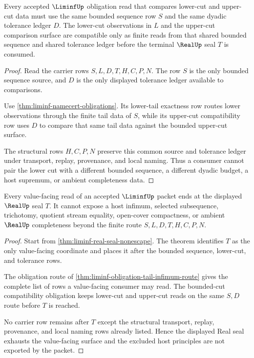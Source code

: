 \begin{theorem}
\label{thm:liminf-obligation-bounded-cut-compatibility}
Every accepted $\LiminfUp$ obligation read that compares lower-cut and upper-cut data must use the same bounded sequence row $S$ and the same dyadic tolerance ledger $D$. The lower-cut observations in $L$ and the upper-cut comparison surface are compatible only as finite reads from that shared bounded sequence and shared tolerance ledger before the terminal $\RealUp$ seal $T$ is consumed.
\end{theorem}
\begin{proof}
Read the carrier rows $S,L,D,T,H,C,P,N$. The row $S$ is the only bounded sequence source, and $D$ is the only displayed tolerance ledger available to comparisons.

Use \autoref{thm:liminf-namecert-obligations}. Its lower-tail exactness row routes lower observations through the finite tail data of $S$, while its upper-cut compatibility row uses $D$ to compare that same tail data against the bounded upper-cut surface.

The structural rows $H,C,P,N$ preserve this common source and tolerance ledger under transport, replay, provenance, and local naming. Thus a consumer cannot pair the lower cut with a different bounded sequence, a different dyadic budget, a host supremum, or ambient completeness data.
\end{proof}

\begin{theorem}
\label{thm:liminf-obligation-real-seal-exhaustion}
Every value-facing read of an accepted $\LiminfUp$ packet ends at the displayed $\RealUp$ seal $T$. It cannot expose a host infimum, selected subsequence, trichotomy, quotient stream equality, open-cover compactness, or ambient $\RealUp$ completeness beyond the finite route $S,L,D,T,H,C,P,N$.
\end{theorem}
\begin{proof}
Start from \autoref{thm:liminf-real-seal-nonescape}. The theorem identifies $T$ as the only value-facing coordinate and places it after the bounded sequence, lower-cut, and tolerance rows.

The obligation route of \autoref{thm:liminf-obligation-tail-infimum-route} gives the complete list of rows a value-facing consumer may read. The bounded-cut compatibility obligation keeps lower-cut and upper-cut reads on the same $S,D$ route before $T$ is reached.

No carrier row remains after $T$ except the structural transport, replay, provenance, and local naming rows already listed. Hence the displayed Real seal exhausts the value-facing surface and the excluded host principles are not exported by the packet.
\end{proof}

